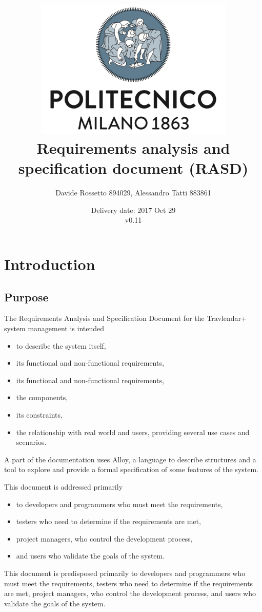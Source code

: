 \documentclass{article}
\title{ 
	\includegraphics[width=95mm]{img/PolimiLogo.png} \\
	\bigskip
	Requirements analysis and specification document (RASD)
}
\author{
	Davide Rossetto 894029, Alessandro Tatti 883861
}
\date{
	Delivery date: 2017 Oct 29\\
	\bigskip v0.11
}
\begin{document}
	
\maketitle
\newpage
\tableofcontents
\newpage
	
	
	\section{Introduction}
	
	
	\subsection{Purpose}
	The Requirements Analysis and Specification Document for the Travlendar+ system management is intended
	\begin{itemize}
		\item to describe the system itself, 
		\item its functional and non-functional requirements, 
		\item its functional and non-functional requirements, 
		\item the components, 
		\item its constraints,
		\item the relationship with real world and users,  providing several use cases and scenarios.
	\end{itemize}

	\bigskip
	A part of the documentation uses Alloy, a language to describe structures and a tool to explore and provide a formal specification of some features of the system.

	\bigskip
	This document is addressed primarily 
	\begin{itemize}
		\item to developers and programmers who must meet the requirements,
		\item testers who need to determine if the requirements are met,
		\item project managers, who control the development process,
		\item and users who validate the goals of the system.
	\end{itemize}
	
	\bigskip
	This document is predisposed primarily to developers and programmers who must meet the requirements, testers who need to determine if the requirements are met, project managers, who control the development process, and users who validate the goals of the system.
	
\end{document}
